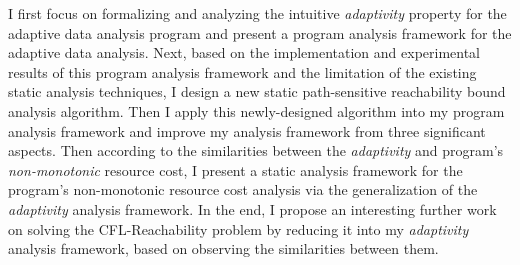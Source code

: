 \begin{abstractpage}
 I first focus on formalizing and analyzing the intuitive \emph{adaptivity} property for 
 the adaptive data analysis program
 and present 
a program analysis framework for the adaptive data analysis.
 Next, based on
  the implementation and experimental results 
of this program analysis framework
and the limitation of the existing static analysis techniques,
I design a new static path-sensitive reachability bound analysis algorithm.
Then I apply this newly-designed algorithm into my program analysis framework and improve my analysis 
framework from three significant aspects.
Then according to the similarities between the \emph{adaptivity} and program's \emph{non-monotonic} resource cost,
I present 
a static analysis framework for the program's {non-monotonic} resource cost analysis via
the generalization of the \emph{adaptivity} analysis framework.
In the end, 
I propose an interesting further work on solving the 
CFL-Reachability problem by reducing it into my \emph{adaptivity} analysis framework, 
based on observing the similarities between them.
 
\end{abstractpage}
